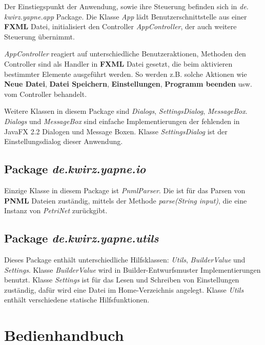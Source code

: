 \documentclass[12pt]{article}
\begin{document}
Der Einstiegspunkt der Anwendung, sowie ihre Steuerung befinden sich in \emph{de.\\kwirz.yapne.app} Package. Die Klasse \emph{App} 
lädt Benutzerschnittstelle aus einer \textbf{FXML} Datei, initialisiert den Controller \emph{AppController}, der auch weitere Steuerung
übernimmt.

\emph{AppController} reagiert auf unterschiedliche Benutzeraktionen, Methoden den Controller sind als Handler in \textbf{FXML} Datei gesetzt, die beim aktivieren bestimmter Elemente ausgeführt werden. So werden z.B. solche Aktionen wie \textbf{Neue Datei}, \textbf{Datei Speichern}, \textbf{Einstellungen}, \textbf{Programm beenden} usw. vom Controller behandelt.


Weitere Klassen in diesem Package sind \emph{Dialogs}, \emph{SettingsDialog}, \emph{MessageBox}. \emph{Dialogs} und \emph{MessageBox} sind einfache Implementierungen der fehlenden in JavaFX 2.2 Dialogen und Message Boxen. Klasse \emph{SettingsDialog} ist der Einstellungsdialog dieser Anwendung.

\subsection{Package \emph{de.kwirz.yapne.io}}

Einzige Klasse in diesem Package ist \emph{PnmlParser}. Die ist für das Parsen von \textbf{PNML} Dateien zuständig, mittels der Methode \emph{parse(String input)}, die eine Instanz von \emph{PetriNet} zurückgibt.

\subsection{Package \emph{de.kwirz.yapne.utils}}

Dieses Package enthält unterschiedliche Hilfsklassen: \emph{Utils}, \emph{BuilderValue} und \emph{Settings}. Klasse \emph{BuilderValue} wird in Builder-Entwurfsmuster Implementierungen benutzt. Klasse \emph{Settings} ist für das Lesen und Schreiben von Einstellungen zuständig, dafür wird eine Datei im Home-Verzeichnis angelegt. Klasse \emph{Utils} enthält verschiedene statische Hilfsfunktionen.


\section{Bedienhandbuch}
\end{document}

